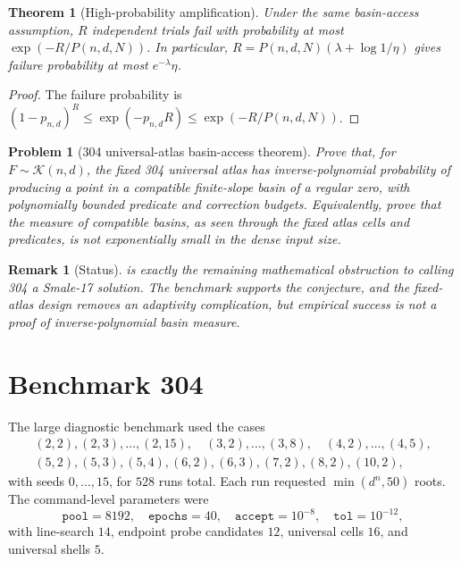 \documentclass[11pt]{article}
\newtheorem{theorem}[definition]{Theorem}
\newtheorem{problem}[definition]{Problem}
\newtheorem{remark}[definition]{Remark}
\newcommand{\K}{\mathcal K}
\begin{document}
\begin{theorem}[High-probability amplification]\label{thm:amplification}
Under the same basin-access assumption, $R$ independent trials fail with probability at most $\exp(-R/P(n,d,N))$.  In particular, $R=P(n,d,N)(\lambda+\log 1/\eta)$ gives failure probability at most $e^{-\lambda}\eta$.
\end{theorem}

\begin{proof}
The failure probability is $(1-p_{n,d})^R\le\exp(-p_{n,d}R)\le\exp(-R/P(n,d,N))$.
\end{proof}

\begin{problem}[304 universal-atlas basin-access theorem]\label{prob:304-basin-access}
Prove that, for $F\sim\K(n,d)$, the fixed 304 universal atlas has inverse-polynomial probability of producing a point in a compatible finite-slope basin of a regular zero, with polynomially bounded predicate and correction budgets.
Equivalently, prove that the measure of compatible basins, as seen through the fixed atlas cells and predicates, is not exponentially small in the dense input size.
\end{problem}

\begin{remark}[Status]
 is exactly the remaining mathematical obstruction to calling 304 a Smale-17 solution.  The benchmark supports the conjecture, and the fixed-atlas design removes an adaptivity complication, but empirical success is not a proof of inverse-polynomial basin measure.
\end{remark}

\section{Benchmark 304}

The large diagnostic benchmark used the cases
\[
\begin{gathered}
(2,2),(2,3),\ldots,(2,15),\quad
(3,2),\ldots,(3,8),\quad
(4,2),\ldots,(4,5),\\
(5,2),(5,3),(5,4),(6,2),(6,3),(7,2),(8,2),(10,2),
\end{gathered}
\]
with seeds $0,\ldots,15$, for $528$ runs total.  Each run requested $\min(d^n,50)$ roots.  The command-level parameters were
\[
\texttt{pool}=8192,
\quad \texttt{epochs}=40,
\quad \texttt{accept}=10^{-8},
\quad \texttt{tol}=10^{-12},
\]
with line-search $14$, endpoint probe candidates $12$, universal cells $16$, and universal shells $5$.
\end{document}

